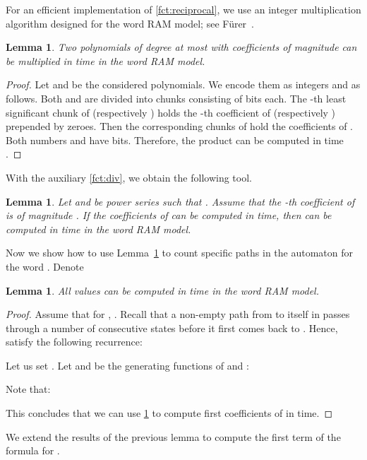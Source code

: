 \documentclass{article}
\newcommand{\mayqed}{}
\newtheorem{lemma}[theorem]{Lemma}
\theoremstyle{definition}
\theoremstyle{remark}
\begin{document}
\noindent
For an efficient implementation of \cref{fct:reciprocal}, we use an integer multiplication algorithm
designed for the word RAM model; see F\"urer~\cite{DBLP:conf/latin/Furer14a}.

\begin{lemma}\label{lem:multiply}
  Two polynomials of degree at most  with coefficients of magnitude 
  can be multiplied in  time in the word RAM model.
\end{lemma}
\begin{proof}
  Let  and  be the considered polynomials.
  We encode them as integers  and  as follows.
  Both  and  are divided into  chunks consisting of  bits each.
  The -th least significant chunk of  (respectively ) holds the -th coefficient of  (respectively )
  prepended by zeroes.
  Then the corresponding chunks of  hold the coefficients of .
  Both numbers  and  have  bits.
  Therefore, the product  can be computed in  time \cite{DBLP:conf/latin/Furer14a}.
\mayqed\end{proof}

\noindent
With the auxiliary \cref{fct:div}, we obtain the following tool.

\begin{lemma}\label{lem:generating}
  Let  and  be power series such that .
  Assume that the -th coefficient of  is of magnitude .
  If the coefficients of  can be computed in  time,
  then  can be computed in  time
  in the word RAM model.
\end{lemma}

Now we show how to use Lemma~\ref{lem:generating} to count specific paths in
the automaton  for the word .
Denote


\begin{lemma}\label{lem:T}
  All values  can be computed in  time in the word RAM model.
\end{lemma}
\begin{proof}
  Assume that for , .
  Recall that a non-empty path from  to itself in  passes through a number of consecutive states
   before it first comes back to .
  Hence,  satisfy the following recurrence:
  
  Let us set .
  Let  and  be the generating functions of  and :
  
  Note that:
  
  This concludes that we can use \cref{lem:generating} to compute  first coefficients of 
  in  time.
\mayqed\end{proof}

We extend the results of the previous lemma to compute the first term of the formula for .
\end{document}

